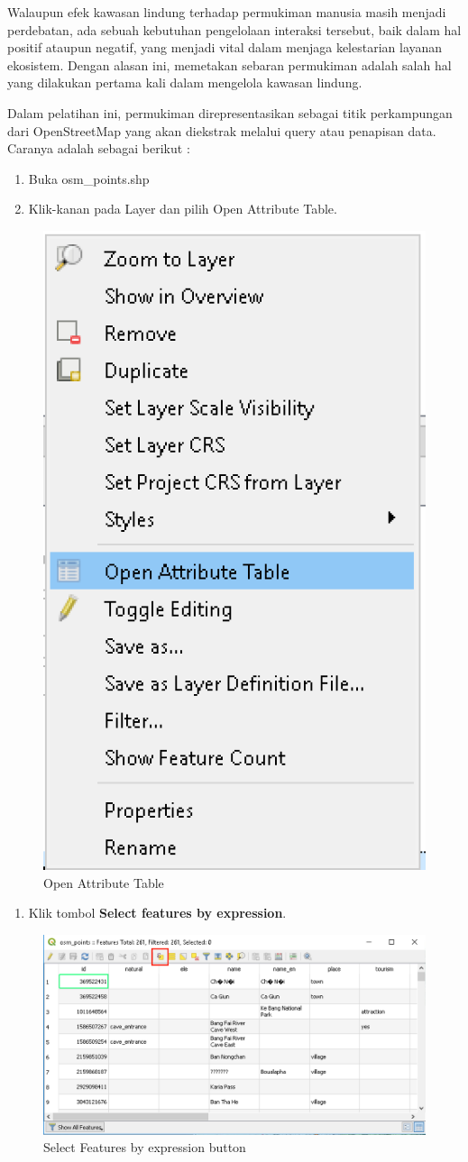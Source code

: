 \documentclass[]{book}
\providecommand{\tightlist}{%
  \setlength{\itemsep}{0pt}\setlength{\parskip}{0pt}}
\begin{document}
Walaupun efek kawasan lindung terhadap permukiman manusia masih menjadi perdebatan, ada sebuah kebutuhan pengelolaan interaksi tersebut, baik dalam hal positif ataupun negatif, yang menjadi vital dalam menjaga kelestarian layanan ekosistem. Dengan alasan ini, memetakan sebaran permukiman adalah salah hal yang dilakukan pertama kali dalam mengelola kawasan lindung.

Dalam pelatihan ini, permukiman direpresentasikan sebagai titik perkampungan dari OpenStreetMap yang akan diekstrak melalui query atau penapisan data. Caranya adalah sebagai berikut :

\begin{enumerate}
\def\labelenumi{\arabic{enumi}.}
\item
  Buka osm\_points.shp
\item
  Klik-kanan pada Layer dan pilih Open Attribute Table.
\end{enumerate}

\begin{figure}

{\centering \includegraphics[width=0.3\linewidth]{images/04/fig24} 

}

\caption{Open Attribute Table}\label{fig:fig1424}
\end{figure}

\begin{enumerate}
\def\labelenumi{\arabic{enumi}.}
\setcounter{enumi}{2}
\tightlist
\item
  Klik tombol \textbf{Select features by expression}.
\end{enumerate}

\begin{figure}

{\centering \includegraphics[width=0.7\linewidth]{images/04/fig25} 

}

\caption{Select Features by expression button}\label{fig:fig1425}
\end{figure}
\end{document}
